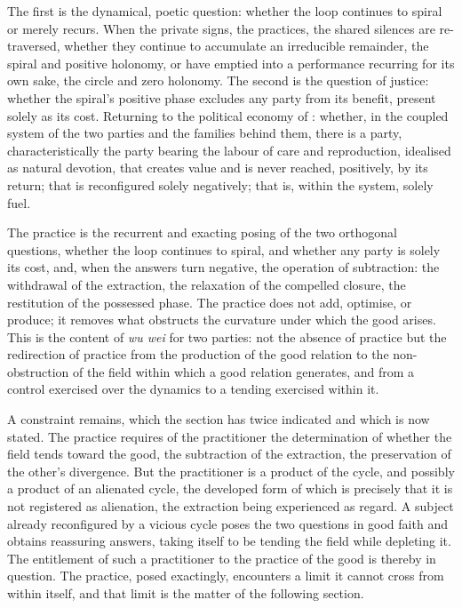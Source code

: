 The first is the dynamical, poetic question: whether the loop continues to spiral or merely recurs. When the private signs, the practices, the shared silences are re-traversed, whether they continue to accumulate an irreducible remainder, the spiral and positive holonomy, or have emptied into a performance recurring for its own sake, the circle and zero holonomy. The second is the question of justice: whether the spiral's positive phase excludes any party from its benefit, present solely as its cost. Returning to the political economy of : whether, in the coupled system of the two parties and the families behind them, there is a party, characteristically the party bearing the labour of care and reproduction, idealised as natural devotion, that creates value and is never reached, positively, by its return; that is reconfigured solely negatively; that is, within the system, solely fuel.

\begin{claim}
The practice is the recurrent and exacting posing of the two orthogonal questions, whether the loop continues to spiral, and whether any party is solely its cost, and, when the answers turn negative, the operation of subtraction: the withdrawal of the extraction, the relaxation of the compelled closure, the restitution of the possessed phase. The practice does not add, optimise, or produce; it removes what obstructs the curvature under which the good arises. This is the content of \emph{wu wei} for two parties: not the absence of practice but the redirection of practice from the production of the good relation to the non-obstruction of the field within which a good relation generates, and from a control exercised over the dynamics to a tending exercised within it.
\end{claim}

\noindent
A constraint remains, which the section has twice indicated and which is now stated. The practice requires of the practitioner the determination of whether the field tends toward the good, the subtraction of the extraction, the preservation of the other's divergence. But the practitioner is a product of the cycle, and possibly a product of an alienated cycle, the developed form of which is precisely that it is not registered as alienation, the extraction being experienced as regard. A subject already reconfigured by a vicious cycle poses the two questions in good faith and obtains reassuring answers, taking itself to be tending the field while depleting it. The entitlement of such a practitioner to the practice of the good is thereby in question. The practice, posed exactingly, encounters a limit it cannot cross from within itself, and that limit is the matter of the following section.

